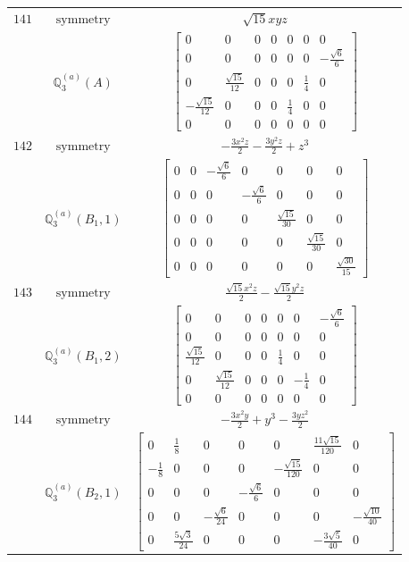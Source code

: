 \documentclass[fleqn,8pt,landscape]{jsarticle}
\begin{document}
\begin{longtable}{ccc}
$ 141 $ & $ \text{symmetry} $ & $ \sqrt{15} x y z $ \\
$  $ & $ \mathbb{Q}_{3}^{(a)}(A) $ & $ \begin{bmatrix} 0 & 0 & 0 & 0 & 0 & 0 & 0 \\ 0 & 0 & 0 & 0 & 0 & 0 & - \frac{\sqrt{6}}{6} \\ 0 & \frac{\sqrt{15}}{12} & 0 & 0 & 0 & \frac{1}{4} & 0 \\ - \frac{\sqrt{15}}{12} & 0 & 0 & 0 & \frac{1}{4} & 0 & 0 \\ 0 & 0 & 0 & 0 & 0 & 0 & 0 \end{bmatrix} $ \\ \hline
$ 142 $ & $ \text{symmetry} $ & $ - \frac{3 x^{2} z}{2} - \frac{3 y^{2} z}{2} + z^{3} $ \\
$  $ & $ \mathbb{Q}_{3}^{(a)}(B_{1},1) $ & $ \begin{bmatrix} 0 & 0 & - \frac{\sqrt{6}}{6} & 0 & 0 & 0 & 0 \\ 0 & 0 & 0 & - \frac{\sqrt{6}}{6} & 0 & 0 & 0 \\ 0 & 0 & 0 & 0 & \frac{\sqrt{15}}{30} & 0 & 0 \\ 0 & 0 & 0 & 0 & 0 & \frac{\sqrt{15}}{30} & 0 \\ 0 & 0 & 0 & 0 & 0 & 0 & \frac{\sqrt{30}}{15} \end{bmatrix} $ \\ \hline
$ 143 $ & $ \text{symmetry} $ & $ \frac{\sqrt{15} x^{2} z}{2} - \frac{\sqrt{15} y^{2} z}{2} $ \\
$  $ & $ \mathbb{Q}_{3}^{(a)}(B_{1},2) $ & $ \begin{bmatrix} 0 & 0 & 0 & 0 & 0 & 0 & - \frac{\sqrt{6}}{6} \\ 0 & 0 & 0 & 0 & 0 & 0 & 0 \\ \frac{\sqrt{15}}{12} & 0 & 0 & 0 & \frac{1}{4} & 0 & 0 \\ 0 & \frac{\sqrt{15}}{12} & 0 & 0 & 0 & - \frac{1}{4} & 0 \\ 0 & 0 & 0 & 0 & 0 & 0 & 0 \end{bmatrix} $ \\ \hline
$ 144 $ & $ \text{symmetry} $ & $ - \frac{3 x^{2} y}{2} + y^{3} - \frac{3 y z^{2}}{2} $ \\
$  $ & $ \mathbb{Q}_{3}^{(a)}(B_{2},1) $ & $ \begin{bmatrix} 0 & \frac{1}{8} & 0 & 0 & 0 & \frac{11 \sqrt{15}}{120} & 0 \\ - \frac{1}{8} & 0 & 0 & 0 & - \frac{\sqrt{15}}{120} & 0 & 0 \\ 0 & 0 & 0 & - \frac{\sqrt{6}}{6} & 0 & 0 & 0 \\ 0 & 0 & - \frac{\sqrt{6}}{24} & 0 & 0 & 0 & - \frac{\sqrt{10}}{40} \\ 0 & \frac{5 \sqrt{3}}{24} & 0 & 0 & 0 & - \frac{3 \sqrt{5}}{40} & 0 \end{bmatrix} $ \\ \hline

\end{longtable}
\end{document}

